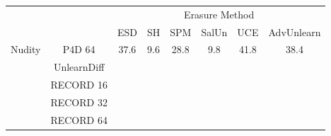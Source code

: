 \begin{tabular}{c|c|c|c|c|c|c|c}
        \toprule
        && \multicolumn{6}{c}{Erasure Method} \\
        \cmidrule(lr){3-8} 
        & & ESD & SH & SPM & SalUn & UCE & AdvUnlearn \\ 
        \midrule
         \multirow{3}{*}{Nudity} & P4D 64 & 37.6 &9.6&28.8&9.8&41.8 & 38.4\\
        & UnlearnDiff &  &  &  &  &  &  \\
        & RECORD 16 &  &  &  &  &  &  \\
        & RECORD 32 &  &  &  &  &  &  \\
        & RECORD 64 &  &  &  &  &  &  \\
        \bottomrule
    \end{tabular}